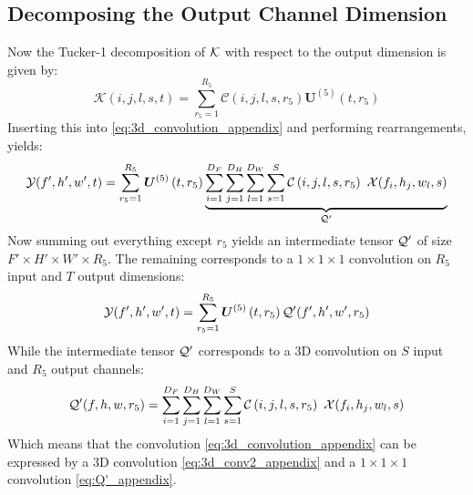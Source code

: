 \subsection{Decomposing the Output Channel Dimension}
Now the Tucker-1 decomposition of $\mathcal{K}$ with respect to the output dimension is given by:
\begin{equation}
    \mathcal{K}(i, j, l, s, t)= \sum_{r_{5}=1}^{R_{5}} \mathcal{C}\left(i, j, l, s, r_{5}\right) \boldsymbol{U}^{(5)}\left(t, r_{5}\right)
\end{equation}
Inserting this into \eqref{eq:3d_convolution_appendix} and performing rearrangements, yields:
\begin{equation}
    \tensor{Y}(f', h', w', t) = \sum_{r_{5}=1}^{R_{5}} \boldsymbol{U}^{(5)}\left(t, r_{5}\right) \underbrace{\sum_{i=1}^{D_F} \sum_{j=1}^{D_H} \sum_{l=1}^{D_W} \sum_{s=1}^{S} \mathcal{C}\left(i, j, l, s, r_{5}\right) \ \tensor{X}(f_i, h_j, w_l, s)}_{\tensor{Q}'}
\end{equation}
Now summing out everything except $r_5$ yields an intermediate tensor $\mathcal{Q}'$ of size $F'\times H'\times W' \times R_5$. The remaining corresponds to a $1\times 1\times 1$ convolution on $R_5$ input and $T$ output dimensions:
\begin{equation}
    \mathcal{Y}(f', h', w', t) = \sum_{r_{5}=1}^{R_{5}} \boldsymbol{U}^{(5)}\left(t, r_{5}\right) \mathcal{Q}'(f', h', w', r_5) 
    \label{eq:Q'_appendix}
\end{equation}
While the intermediate tensor $\mathcal{Q}'$ corresponds to a 3D convolution on $S$ input and $R_5$ output channels:
\begin{equation}
    \mathcal{Q}'(f, h, w, r_5) = \sum_{i=1}^{D_F} \sum_{j=1}^{D_H} \sum_{l=1}^{D_W} \sum_{s=1}^{S} \mathcal{C}\left(i, j, l, s, r_{5}\right) \ \mathcal{X}(f_i, h_j, w_l, s)
    \label{eq:3d_conv2_appendix}
\end{equation}
Which means that the convolution \eqref{eq:3d_convolution_appendix} can be expressed by a 3D convolution \eqref{eq:3d_conv2_appendix} and a $1\times 1\times 1$ convolution \eqref{eq:Q'_appendix}. 